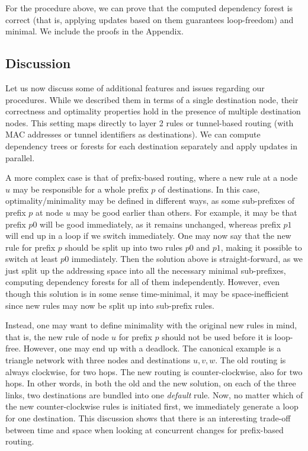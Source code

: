 For the procedure above, we can prove that the computed dependency forest is correct (that is, applying updates based on them guarantees loop-freedom) and minimal. We include the proofs in the Appendix.


\subsection{Discussion} 

Let us now discuss some of additional features and issues regarding our procedures. While we described them in terms of a single destination node, their correctness and optimality properties hold in the presence of multiple destination nodes. This setting maps directly to layer 2 rules or tunnel-based routing (with MAC addresses or tunnel identifiers as destinations).  We can compute dependency trees or forests for each destination separately and apply updates in parallel.

A more complex case is that of prefix-based routing, where a new rule at a node $u$ may be responsible for a whole prefix $p$ of destinations. In this case, optimality/minimality may be defined in different ways, as some sub-prefixes of prefix $p$ at node $u$ may be good earlier than others. For example, it may be that prefix $p0$ will be good immediately, as it remains unchanged, whereas prefix $p1$ will end up in a loop if we switch immediately. One may now say that the new rule for prefix $p$ should be split up into two rules $p0$ and $p1$, making it possible to switch at least $p0$ immediately. Then the solution above is straight-forward, as we just split up the addressing space into all the necessary minimal sub-prefixes, computing dependency forests for all of them independently. However, even though this solution is in some sense time-minimal, it may be space-inefficient since new rules may now be split up into sub-prefix rules.

Instead, one may want to define minimality with the original new rules in mind, that is, the new rule of node $u$ for prefix $p$ should not be used before it is loop-free. However, one may end up with a deadlock. The canonical example is a triangle network with three nodes and destinations $u,v,w$. The old routing is always clockwise, for two hops. The new routing is counter-clockwise, also for two hops. In other words, in both the old and the new solution, on each of the three links, two destinations are bundled into one \emph{default} rule. Now, no matter which of the new counter-clockwise rules is initiated first, we immediately generate a loop for one destination. This discussion shows that there is an interesting trade-off between time and space when looking at concurrent changes for prefix-based routing.


